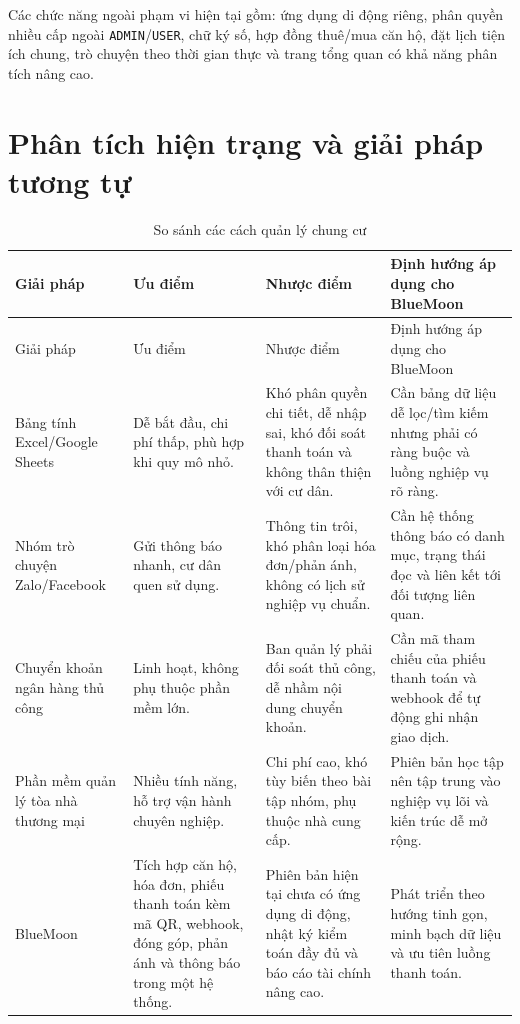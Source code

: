 ﻿\documentclass[12pt,a4paper]{report}
\newcommand{\projectname}{BlueMoon}
\begin{document}
Các chức năng ngoài phạm vi hiện tại gồm: ứng dụng di động riêng, phân quyền nhiều cấp ngoài \texttt{ADMIN}/\texttt{USER}, chữ ký số, hợp đồng thuê/mua căn hộ, đặt lịch tiện ích chung, trò chuyện theo thời gian thực và trang tổng quan có khả năng phân tích nâng cao.

\section{Phân tích hiện trạng và giải pháp tương tự}
\begin{longtable}{L{3.1cm} L{4.0cm} L{4.0cm} L{3.4cm}}
\caption{So sánh các cách quản lý chung cư}\label{tab:market}\\
\toprule
Giải pháp & Ưu điểm & Nhược điểm & Định hướng áp dụng cho \projectname \\
\midrule
\endfirsthead
\toprule
Giải pháp & Ưu điểm & Nhược điểm & Định hướng áp dụng cho \projectname \\
\midrule
\endhead
Bảng tính Excel/Google Sheets & Dễ bắt đầu, chi phí thấp, phù hợp khi quy mô nhỏ. & Khó phân quyền chi tiết, dễ nhập sai, khó đối soát thanh toán và không thân thiện với cư dân. & Cần bảng dữ liệu dễ lọc/tìm kiếm nhưng phải có ràng buộc và luồng nghiệp vụ rõ ràng. \\
Nhóm trò chuyện Zalo/Facebook & Gửi thông báo nhanh, cư dân quen sử dụng. & Thông tin trôi, khó phân loại hóa đơn/phản ánh, không có lịch sử nghiệp vụ chuẩn. & Cần hệ thống thông báo có danh mục, trạng thái đọc và liên kết tới đối tượng liên quan. \\
Chuyển khoản ngân hàng thủ công & Linh hoạt, không phụ thuộc phần mềm lớn. & Ban quản lý phải đối soát thủ công, dễ nhầm nội dung chuyển khoản. & Cần mã tham chiếu của phiếu thanh toán và webhook để tự động ghi nhận giao dịch. \\
Phần mềm quản lý tòa nhà thương mại & Nhiều tính năng, hỗ trợ vận hành chuyên nghiệp. & Chi phí cao, khó tùy biến theo bài tập nhóm, phụ thuộc nhà cung cấp. & Phiên bản học tập nên tập trung vào nghiệp vụ lõi và kiến trúc dễ mở rộng. \\
\projectname & Tích hợp căn hộ, hóa đơn, phiếu thanh toán kèm mã QR, webhook, đóng góp, phản ánh và thông báo trong một hệ thống. & Phiên bản hiện tại chưa có ứng dụng di động, nhật ký kiểm toán đầy đủ và báo cáo tài chính nâng cao. & Phát triển theo hướng tinh gọn, minh bạch dữ liệu và ưu tiên luồng thanh toán. \\
\bottomrule
\end{longtable}
\end{document}
